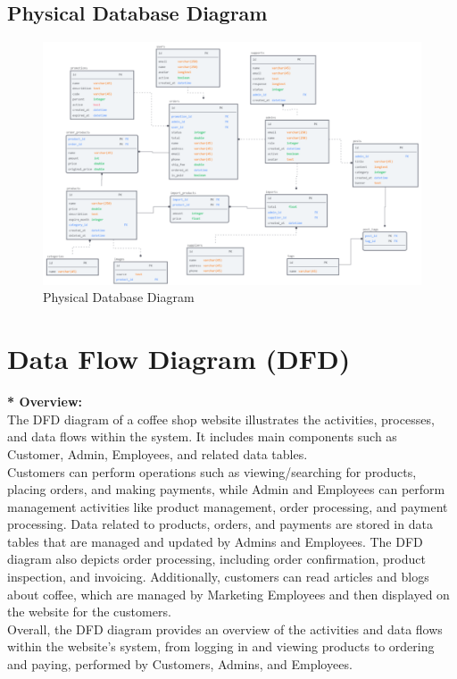 

\subsection{Physical Database Diagram}
\begin{figure}[H]
  \centering
  \includegraphics[width=1.1\textwidth]{physical.png}
  \caption{Physical Database Diagram}
  \label{fig:physicaldatabase}
\end{figure}


\section{Data Flow Diagram (DFD)}
\textbf{* Overview:}\\
The DFD diagram of a coffee shop website illustrates the activities, processes, and data flows within the system. It includes main components such as Customer, Admin, Employees, and related data tables. \\
Customers can perform operations such as viewing/searching for products, placing orders, and making payments, while Admin and Employees can perform management activities like product management, order processing, and payment processing. Data related to products, orders, and payments are stored in data tables that are managed and updated by Admins and Employees. The DFD diagram also depicts order processing, including order confirmation, product inspection, and invoicing. Additionally, customers can read articles and blogs about coffee, which are managed by Marketing Employees and then displayed on the website for the customers. \\ Overall, the DFD diagram provides an overview of the activities and data flows within the website's system, from logging in and viewing products to ordering and paying, performed by Customers, Admins, and Employees.
